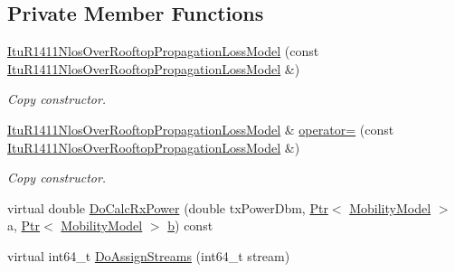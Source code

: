 \subsection*{Private Member Functions}
\begin{DoxyCompactItemize}
\item 
\hyperlink{classns3_1_1ItuR1411NlosOverRooftopPropagationLossModel_a19c16e75c86e40aeda486dd4067e3118}{Itu\+R1411\+Nlos\+Over\+Rooftop\+Propagation\+Loss\+Model} (const \hyperlink{classns3_1_1ItuR1411NlosOverRooftopPropagationLossModel}{Itu\+R1411\+Nlos\+Over\+Rooftop\+Propagation\+Loss\+Model} \&)
\begin{DoxyCompactList}\small\item\em Copy constructor. \end{DoxyCompactList}\item 
\hyperlink{classns3_1_1ItuR1411NlosOverRooftopPropagationLossModel}{Itu\+R1411\+Nlos\+Over\+Rooftop\+Propagation\+Loss\+Model} \& \hyperlink{classns3_1_1ItuR1411NlosOverRooftopPropagationLossModel_a26f2b6af3816d0f39c3399f8a45c6f9c}{operator=} (const \hyperlink{classns3_1_1ItuR1411NlosOverRooftopPropagationLossModel}{Itu\+R1411\+Nlos\+Over\+Rooftop\+Propagation\+Loss\+Model} \&)
\begin{DoxyCompactList}\small\item\em Copy constructor. \end{DoxyCompactList}\item 
virtual double \hyperlink{classns3_1_1ItuR1411NlosOverRooftopPropagationLossModel_a3afc938f060814307382eb07791ff00b}{Do\+Calc\+Rx\+Power} (double tx\+Power\+Dbm, \hyperlink{classns3_1_1Ptr}{Ptr}$<$ \hyperlink{classns3_1_1MobilityModel}{Mobility\+Model} $>$ a, \hyperlink{classns3_1_1Ptr}{Ptr}$<$ \hyperlink{classns3_1_1MobilityModel}{Mobility\+Model} $>$ \hyperlink{lte__pathloss_8m_a21ad0bd836b90d08f4cf640b4c298e7c}{b}) const 
\item 
virtual int64\+\_\+t \hyperlink{classns3_1_1ItuR1411NlosOverRooftopPropagationLossModel_af3bbb825a31587269421ce967537e517}{Do\+Assign\+Streams} (int64\+\_\+t stream)
\end{DoxyCompactItemize}
